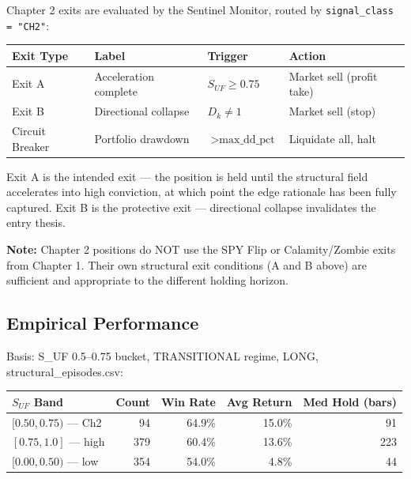 \documentclass[11pt, a4paper]{article}
\begin{document}
Chapter 2 exits are evaluated by the Sentinel Monitor, routed by \texttt{signal\_class = "CH2"}:

\begin{center}
\begin{tabular}{@{}llll@{}}
\toprule
\textbf{Exit Type} & \textbf{Label} & \textbf{Trigger} & \textbf{Action} \\
\midrule
Exit A & Acceleration complete & $S_{UF} \geq 0.75$ & Market sell (profit take) \\
Exit B & Directional collapse  & $D_k \neq 1$       & Market sell (stop) \\
Circuit Breaker & Portfolio drawdown & $> \text{max\_dd\_pct}$ & Liquidate all, halt \\
\bottomrule
\end{tabular}
\end{center}

Exit A is the intended exit — the position is held until the structural field accelerates
into high conviction, at which point the edge rationale has been fully captured.
Exit B is the protective exit — directional collapse invalidates the entry thesis.

\textbf{Note:} Chapter 2 positions do NOT use the SPY Flip or Calamity/Zombie exits
from Chapter 1. Their own structural exit conditions (A and B above) are sufficient
and appropriate to the different holding horizon.

\subsection{Empirical Performance}

Basis: S_UF 0.5--0.75 bucket, TRANSITIONAL regime, LONG, structural\_episodes.csv:

\begin{center}
\begin{tabular}{@{}lrrrr@{}}
\toprule
\textbf{$S_{UF}$ Band} & \textbf{Count} & \textbf{Win Rate} & \textbf{Avg Return} & \textbf{Med Hold (bars)} \\
\midrule
$[0.50, 0.75)$ — Ch2 & 94  & 64.9\% & 15.0\% & 91  \\
$[0.75, 1.0]$ — high  & 379 & 60.4\% & 13.6\% & 223 \\
$[0.00, 0.50)$ — low  & 354 & 54.0\% &  4.8\% &  44 \\
\bottomrule
\end{tabular}
\end{center}

\end{document}
